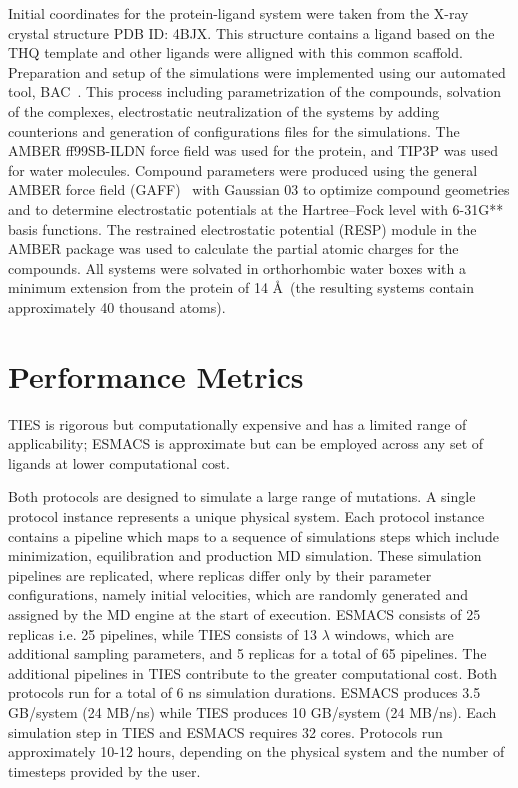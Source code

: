\documentclass[conference]{IEEEtran}
\begin{document}
Initial coordinates for the protein-ligand system were taken from the X-ray
crystal structure PDB ID: 4BJX.
This structure contains a
ligand based on the THQ template and other ligands were alligned with this
common scaffold. Preparation and setup of the simulations were implemented
using our automated tool, BAC~\cite{Sadiq2008}. This process including
parametrization of the compounds, solvation of the complexes, electrostatic
neutralization of the systems by adding counterions and generation of
configurations files for the simulations. The AMBER ff99SB-ILDN
force field was used for the protein, and TIP3P was used
for water molecules. Compound parameters were produced using the general AMBER
force field (GAFF)~\cite{Wang2004} with Gaussian 03
to optimize compound geometries and to determine electrostatic potentials at
the Hartree–Fock level with 6-31G** basis functions. The restrained
electrostatic potential (RESP) module in the AMBER package
was used to calculate the partial atomic charges for the compounds. All systems
were solvated in orthorhombic water boxes with a minimum extension from the
protein of 14 \AA\ (the resulting systems contain approximately 40 thousand
atoms).

\section{Performance Metrics}\label{sec:performance}

TIES is rigorous but computationally expensive and has a limited range of
applicability; ESMACS is approximate but can be employed across any set of
ligands at lower computational cost. 


Both protocols are designed to simulate a large range of mutations. A single 
protocol instance represents a unique physical system. Each protocol instance
contains a pipeline which maps to a sequence of simulations steps which include
minimization, equilibration and production MD simulation. 
These simulation pipelines are replicated, where replicas differ 
only by their parameter configurations,
namely initial velocities, which are randomly generated and assigned by the MD
engine at the start of execution. ESMACS consists of 25 replicas i.e. 
25 pipelines, while TIES 
consists of 13 $\lambda$ windows, which are additional sampling parameters,
and 5 replicas for a total of 65 pipelines. The additional pipelines in TIES 
contribute to the greater computational cost. Both protocols run for a total of 
6 ns simulation durations. ESMACS produces 3.5 GB/system (24 MB/ns) while 
TIES produces 10 GB/system (24 MB/ns). Each simulation step in TIES and ESMACS 
requires 32 cores. Protocols run approximately 10-12 hours, 
depending on the physical system and the number of timesteps provided by the 
user. 
\end{document}

